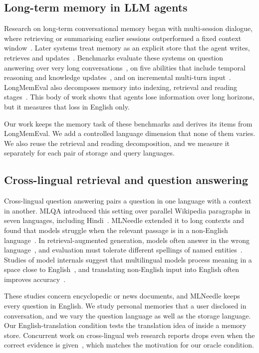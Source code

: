 \documentclass[11pt]{article}
\begin{document}
\subsection{Long-term memory in LLM agents}
Research on long-term conversational memory began with multi-session dialogue, where retrieving or summarising earlier sessions outperformed a fixed context window~\citep{xu2022goldfish}.
Later systems treat memory as an explicit store that the agent writes, retrieves and updates~\citep{packer2023memgpt,zhong2024memorybank,chhikara2025mem0,xu2025amem}.
Benchmarks evaluate these systems on question answering over very long conversations~\citep{maharana2024locomo}, on five abilities that include temporal reasoning and knowledge updates~\citep{wu2025longmemeval}, and on incremental multi-turn input~\citep{hu2026memoryagentbench}.
LongMemEval also decomposes memory into indexing, retrieval and reading stages~\citep{wu2025longmemeval}.
This body of work shows that agents lose information over long horizons, but it measures that loss in English only.

Our work keeps the memory task of these benchmarks and derives its items from LongMemEval.
We add a controlled language dimension that none of them varies.
We also reuse the retrieval and reading decomposition, and we measure it separately for each pair of storage and query languages.

\subsection{Cross-lingual retrieval and question answering}
Cross-lingual question answering pairs a question in one language with a context in another.
MLQA introduced this setting over parallel Wikipedia paragraphs in seven languages, including Hindi~\citep{lewis2020mlqa}.
MLNeedle extended it to long contexts and found that models struggle when the relevant passage is in a non-English language~\citep{hengle2025mlneedle}.
In retrieval-augmented generation, models often answer in the wrong language~\citep{liu2025xrag}, and evaluation must tolerate different spellings of named entities~\citep{chirkova2024mrag}.
Studies of model internals suggest that multilingual models process meaning in a space close to English~\citep{wendler2024llamas}, and translating non-English input into English often improves accuracy~\citep{etxaniz2024selftranslate}.

These studies concern encyclopedic or news documents, and MLNeedle keeps every question in English.
We study personal memories that a user disclosed in conversation, and we vary the question language as well as the storage language.
Our English-translation condition tests the translation idea of \citet{etxaniz2024selftranslate} inside a memory store.
Concurrent work on cross-lingual web research reports drops even when the correct evidence is given~\citep{lu2026xbcp}, which matches the motivation for our oracle condition.
\end{document}
